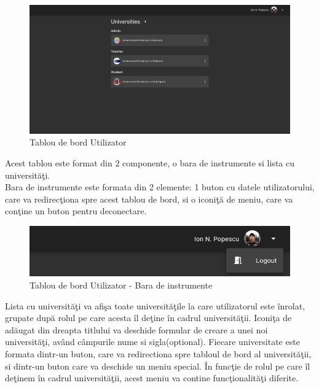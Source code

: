 \documentclass[12pt, a4paper, oneside, romanian]{teza-upb}
\begin{document}
\begin{figure}[H]
\centering
\includegraphics*[width=\columnwidth]{tablou-de-bord-utilizator}
\caption{Tablou de bord Utilizator}
\label{tablou-de-bord-utilizator}
\end{figure}

Acest tablou este format din 2 componente, o bara de instrumente si lista cu universităţi.\\

Bara de instrumente este formata din 2 elemente: 1 buton cu datele utilizatorului, care va redirecţiona spre acest tablou de bord, si o iconiţă de meniu, care va conţine un buton pentru deconectare.

\begin{figure}[H]
\centering
\includegraphics*[width=\columnwidth]{tablou-de-bord-utilizator-bara-de-instrumente}
\caption{Tablou de bord Utilizator - Bara de instrumente}
\label{tablou-de-bord-utilizator-bara-de-instrumente}
\end{figure}

Lista cu universităţi va afişa toate universităţile la care utilizatorul este înrolat, grupate după rolul pe care acesta îl deţine în cadrul universităţii. Iconiţa de adăugat din dreapta titlului va deschide formular de creare a unei noi universităţi, având câmpurile nume si sigla(optional). Fiecare universitate este formata dintr-un buton, care va redirectiona spre tabloul de bord al universităţii, si dintr-un buton care va deschide un meniu special. În funcţie de rolul pe care îl deţinem în cadrul universităţii, acest meniu va contine funcţionalităţi diferite.
\end{document}
